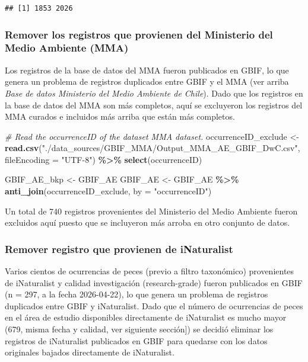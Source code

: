 \documentclass[sn-apa,pdflatex]{sn-jnl}
\newenvironment{Shaded}{\begin{snugshade}}{\end{snugshade}}
\newcommand{\AttributeTok}[1]{\textcolor[rgb]{0.13,0.29,0.53}{#1}}
\newcommand{\CommentTok}[1]{\textcolor[rgb]{0.56,0.35,0.01}{\textit{#1}}}
\newcommand{\FunctionTok}[1]{\textcolor[rgb]{0.13,0.29,0.53}{\textbf{#1}}}
\newcommand{\NormalTok}[1]{#1}
\newcommand{\OtherTok}[1]{\textcolor[rgb]{0.56,0.35,0.01}{#1}}
\newcommand{\SpecialCharTok}[1]{\textcolor[rgb]{0.81,0.36,0.00}{\textbf{#1}}}
\newcommand{\StringTok}[1]{\textcolor[rgb]{0.31,0.60,0.02}{#1}}
\begin{document}
\begin{verbatim}
## [1] 1853 2026
\end{verbatim}

\subsubsection{Remover los registros que provienen del Ministerio del
Medio Ambiente
(MMA)}\label{remover-los-registros-que-provienen-del-ministerio-del-medio-ambiente-mma}

Los registros de la base de datos del MMA fueron publicados en GBIF, lo
que genera un problema de registros duplicados entre GBIF y el MMA (ver
arriba \emph{Base de datos Ministerio del Medio Ambiente de Chile}).
Dado que los registros en la base de datos del MMA son más completos,
aquí se excluyeron los registros del MMA curados e incluidos más arriba
que están más completos.

\begin{Shaded}
\begin{Highlighting}[]
\CommentTok{\# Read the occurrenceID of the dataset MMA dataset.}
\NormalTok{occurrenceID\_exclude }\OtherTok{\textless{}{-}} \FunctionTok{read.csv}\NormalTok{(}\StringTok{"./data\_sources/GBIF\_MMA/Output\_MMA\_AE\_GBIF\_DwC.csv"}\NormalTok{,}
    \AttributeTok{fileEncoding =} \StringTok{"UTF{-}8"}\NormalTok{) }\SpecialCharTok{\%\textgreater{}\%}
    \FunctionTok{select}\NormalTok{(occurrenceID)}

\NormalTok{GBIF\_AE\_bkp }\OtherTok{\textless{}{-}}\NormalTok{ GBIF\_AE}
\NormalTok{GBIF\_AE }\OtherTok{\textless{}{-}}\NormalTok{ GBIF\_AE }\SpecialCharTok{\%\textgreater{}\%}
    \FunctionTok{anti\_join}\NormalTok{(occurrenceID\_exclude, }\AttributeTok{by =} \StringTok{"occurrenceID"}\NormalTok{)}
\end{Highlighting}
\end{Shaded}

Un total de 740 registros provenientes del Ministerio del Medio Ambiente
fueron excluidos aquí puesto que se incluyeron más arroba en otro
conjunto de datos.

\subsubsection{Remover registro que provienen de
iNaturalist}\label{remover-registro-que-provienen-de-inaturalist}

Varios cientos de ocurrencias de peces (previo a filtro taxonómico)
provenientes de iNaturalist y calidad investigación (research-grade)
fueron publicados en GBIF (n = 297, a la fecha 2026-04-22), lo que
genera un problema de registros duplicados entre GBIF y iNaturalist.
Dado que el número de ocurrencias de peces en el área de estudio
disponibles directamente de iNaturalist es mucho mayor (679, misma fecha
y calidad, ver siguiente sección{]}) se decidió eliminar los registros
de iNaturalist publicados en GBIF para quedarse con los datos originales
bajados directamente de iNaturalist.
\end{document}

